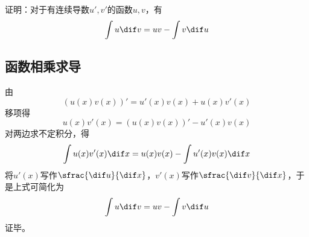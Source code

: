 

证明：对于有连续导数$u', v'$的函数$u, v$，有
\[ \int u \dif v = uv - \int v \dif u \]

\subsection{函数相乘求导}

由
\[ \left(u(x)v(x)\right)' = u'(x)v(x) + u(x)v'(x) \]
移项得
\[ u(x)v'(x) = \left(u(x)v(x)\right)' - u'(x)v(x) \]
对两边求不定积分，得
\[ \int u(x)v'(x) \dif x = u(x)v(x) - \int u'(x)v(x) \dif x \]
将$u'(x)$写作$\sfrac{\dif u}{\dif x}$，$v'(x)$写作$\sfrac{\dif v}{\dif x}$，于是上式可简化为
\[ \int u \dif v = uv - \int v \dif u \]
证毕。
